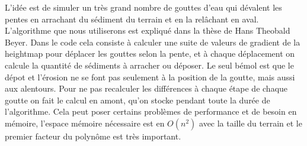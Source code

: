 \documentclass{EPUProjetDi}
\begin{document}
L'idée est de simuler un très grand nombre de gouttes d'eau qui dévalent les pentes en arrachant du sédiment du terrain et en la relâchant en aval. L'algorithme que nous utiliserons est expliqué dans la thèse de Hans Theobald Beyer\cite{erosion}.
Dans le code cela consiste à calculer une suite de valeurs de gradient de la heightmap pour déplacer les gouttes selon la pente, et à chaque déplacement on calcule la quantité de sédiments à arracher ou déposer. Le seul bémol est que le dépot et l'érosion ne se font pas seulement à la position de la goutte, mais aussi aux alentours. Pour ne pas recalculer les différences à chaque étape de chaque goutte on fait le calcul en amont, qu'on stocke pendant toute la durée de l'algorithme. Cela peut poser certains problèmes de performance et de besoin en mémoire, l'espace mémoire nécessaire est en $O(n^2)$ avec la taille du terrain et le premier facteur du polynôme est très important.
\end{document}
